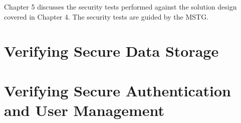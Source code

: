 Chapter 5 discusses the security tests performed against the solution design covered in Chapter 4. The security tests are guided by the MSTG.

\section{Verifying Secure Data Storage}


\section{Verifying Secure Authentication and User Management}
